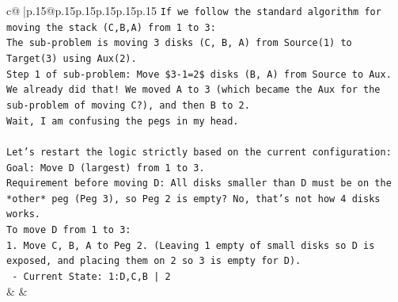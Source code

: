 \documentclass{article}
\begin{document}
{\begin{supertabular}{c@{$\;$}|p{.15\linewidth}@{}p{.15\linewidth}p{.15\linewidth}p{.15\linewidth}p{.15\linewidth}p{.15\linewidth}}
{{{\texttt{If we follow the standard algorithm for moving the stack (C,B,A) from 1 to 3:} \\
\texttt{The sub{-}problem is moving 3 disks (C, B, A) from Source(1) to Target(3) using Aux(2).} \\
\texttt{Step 1 of sub{-}problem: Move \$3{-}1=2\$ disks (B, A) from Source to Aux.} \\
\texttt{We already did that! We moved A to 3 (which became the Aux for the sub{-}problem of moving C?), and then B to 2.} \\
\texttt{Wait, I am confusing the pegs in my head.} \\
\\ 
\texttt{Let's restart the logic strictly based on the current configuration:} \\
\texttt{Goal: Move D (largest) from 1 to 3.} \\
\texttt{Requirement before moving D: All disks smaller than D must be on the *other* peg (Peg 3), so Peg 2 is empty? No, that's not how 4 disks works.} \\
\texttt{To move D from 1 to 3:} \\
\texttt{1. Move C, B, A to Peg 2. (Leaving 1 empty of small disks so D is exposed, and placing them on 2 so 3 is empty for D).} \\
\texttt{   {-} Current State: 1:D,C,B | 2} \\
            }
        }
    }
    & & \\ \\


\end{supertabular}}
\end{document}
